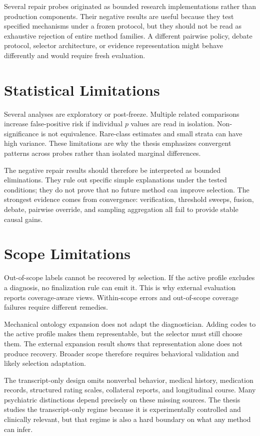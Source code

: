 Several repair probes originated as bounded research implementations rather than production components. Their negative results are useful because they test specified mechanisms under a frozen protocol, but they should not be read as exhaustive rejection of entire method families. A different pairwise policy, debate protocol, selector architecture, or evidence representation might behave differently and would require fresh evaluation.

\section{Statistical Limitations}

Several analyses are exploratory or post-freeze. Multiple related comparisons increase false-positive risk if individual $p$ values are read in isolation. Non-significance is not equivalence. Rare-class estimates and small strata can have high variance. These limitations are why the thesis emphasizes convergent patterns across probes rather than isolated marginal differences.

The negative repair results should therefore be interpreted as bounded eliminations. They rule out specific simple explanations under the tested conditions; they do not prove that no future method can improve selection. The strongest evidence comes from convergence: verification, threshold sweeps, fusion, debate, pairwise override, and sampling aggregation all fail to provide stable causal gains.

\section{Scope Limitations}

Out-of-scope labels cannot be recovered by selection. If the active profile excludes a diagnosis, no finalization rule can emit it. This is why external evaluation reports coverage-aware views. Within-scope errors and out-of-scope coverage failures require different remedies.

Mechanical ontology expansion does not adapt the diagnostician. Adding codes to the active profile makes them representable, but the selector must still choose them. The external expansion result shows that representation alone does not produce recovery. Broader scope therefore requires behavioral validation and likely selection adaptation.

The transcript-only design omits nonverbal behavior, medical history, medication records, structured rating scales, collateral reports, and longitudinal course. Many psychiatric distinctions depend precisely on these missing sources. The thesis studies the transcript-only regime because it is experimentally controlled and clinically relevant, but that regime is also a hard boundary on what any method can infer.

